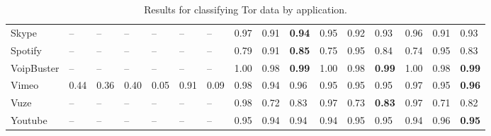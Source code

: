 \begin{table} [ht!]
{\begin{tabular} {|p{2cm}|p{0.7cm}p{0.7cm}p{0.7cm}|p{0.7cm}p{0.7cm}p{0.7cm}|p{0.7cm}p{0.7cm}p{0.7cm}|p{0.7cm}p{0.7cm}p{0.7cm}|p{0.7cm}p{0.7cm}p{0.7cm}|}
Skype & -- & -- & -- & -- & -- & -- & 0.97 & 0.91 & \textbf{0.94} & 0.95 & 0.92 & 0.93 & 0.96 & 0.91 & 0.93 \\
Spotify & -- & -- & -- & -- & -- & -- & 0.79 & 0.91 & \textbf{0.85} & 0.75 & 0.95 & 0.84 & 0.74 & 0.95 & 0.83 \\
VoipBuster & -- & -- & -- & -- & -- & -- & 1.00 & 0.98 & \textbf{0.99} & 1.00 & 0.98 & \textbf{0.99} & 1.00 & 0.98 & \textbf{0.99} \\
Vimeo & 0.44 & 0.36 & 0.40 & 0.05 & 0.91 & 0.09 & 0.98 & 0.94 & 0.96 & 0.95 & 0.95 & 0.95 & 0.97 & 0.95 & \textbf{0.96} \\
Vuze & -- & -- & -- & -- & -- & -- & 0.98 & 0.72 & 0.83 & 0.97 & 0.73 & \textbf{0.83} & 0.97 & 0.71 & 0.82 \\
Youtube & -- & -- & -- & -- & -- & -- & 0.95 & 0.94 & 0.94 & 0.94 & 0.95 & 0.95 & 0.94 & 0.96 & \textbf{0.95} \\
\hline
\end{tabular}}
\caption{Results for classifying Tor data by application.}
\label{tab:torappresults}
\end{table}

